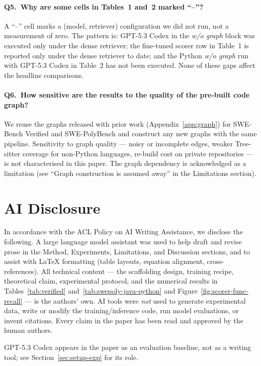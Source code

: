 \paragraph{Q5.\ Why are some cells in Tables~1 and~2 marked
``--''?}
A ``--'' cell marks a (model, retriever) configuration we did
not run, not a measurement of zero. The pattern is: GPT-5.3
Codex in the \emph{w/o graph} block was executed only under the
dense retriever; the fine-tuned scorer row in Table~1 is
reported only under the dense retriever to date; and the
Python \emph{w/o graph} run with GPT-5.3 Codex in
Table~2 has not been executed. None of these gaps affect the
headline comparisons.

\paragraph{Q6.\ How sensitive are the results to the quality of
the pre-built code graph?}
We reuse the graphs released with prior work
(Appendix~\ref{app:graph}) for SWE-Bench Verified and
SWE-PolyBench and construct any new graphs with the same
pipeline. Sensitivity to graph quality --- noisy or incomplete
edges, weaker Tree-sitter coverage for non-Python languages,
re-build cost on private repositories --- is not characterised
in this paper. The graph dependency is acknowledged as a
limitation (see ``Graph construction is assumed away'' in the
Limitations section).

\section{AI Disclosure}
\label{app:ai}

In accordance with the ACL Policy on AI Writing Assistance, we
disclose the following. A large language model assistant was
used to help draft and revise prose in the Method, Experiments,
Limitations, and Discussion sections, and to assist with LaTeX
formatting (table layouts, equation alignment, cross-references).
All technical content --- the scaffolding design, training
recipe, theoretical claim, experimental protocol, and the
numerical results in Tables~\ref{tab:verified}
and~\ref{tab:swepoly-java-python} and
Figure~\ref{fig:scorer-func-recall} --- is the authors' own.
AI tools were \emph{not} used to generate experimental data,
write or modify the training/inference code, run model
evaluations, or invent citations. Every claim in the paper has
been read and approved by the human authors.

GPT-5.3 Codex appears in the paper as an evaluation baseline,
not as a writing tool; see Section~\ref{sec:setup-exp} for its
role.
